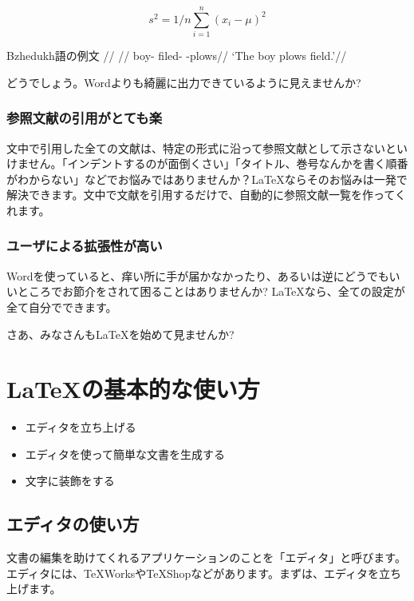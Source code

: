 \documentclass[xelatex,a4paper,base=11pt,twoside,ja=standard]{bxjsarticle}
\begin{document}
\begin{shadebox}
	\begin{equation}
		s^2 = 1/n\sum_{i=1}^n (x_i -\mu)^2
	\end{equation}


\ex
\begingl
\glpreamble Bzhedukh語の例文 \citep{payne1997}//
\gla {}  //
\glb boy-\Erg{} filed-\Abs{} \Tsg{}-plows//
\glft `The boy plows field.'//
\endgl
\xe

\end{shadebox}
どうでしょう。Wordよりも綺麗に出力できているように見えませんか?

\subsubsection{参照文献の引用がとても楽}
文中で引用した全ての文献は、特定の形式に沿って参照文献として示さないといけません。「インデントするのが面倒くさい」「タイトル、巻号なんかを書く順番がわからない」などでお悩みではありませんか？\LaTeX ならそのお悩みは一発で解決できます。文中で文献を引用するだけで、自動的に参照文献一覧を作ってくれます。

\subsubsection{ユーザによる拡張性が高い}
Wordを使っていると、痒い所に手が届かなかったり、あるいは逆にどうでもいいところでお節介をされて困ることはありませんか? \LaTeX なら、全ての設定が全て自分でできます。

さあ、みなさんも\LaTeX を始めて見ませんか?

\section{\LaTeX の基本的な使い方}
\begin{tcolorbox}[colback=white,colframe=black,colbacktitle=mygreyl,coltitle=black,title=この章で説明すること]

\begin{itemize}[style=nextline]
\item エディタを立ち上げる
\item エディタを使って簡単な文書を生成する
\item 文字に装飾をする
\end{itemize}

\end{tcolorbox}


\subsection{エディタの使い方}
文書の編集を助けてくれるアプリケーションのことを「エディタ」と呼びます。エディタには、\TeX Worksや\TeX Shopなどがあります。まずは、エディタを立ち上げます。
\end{document}
